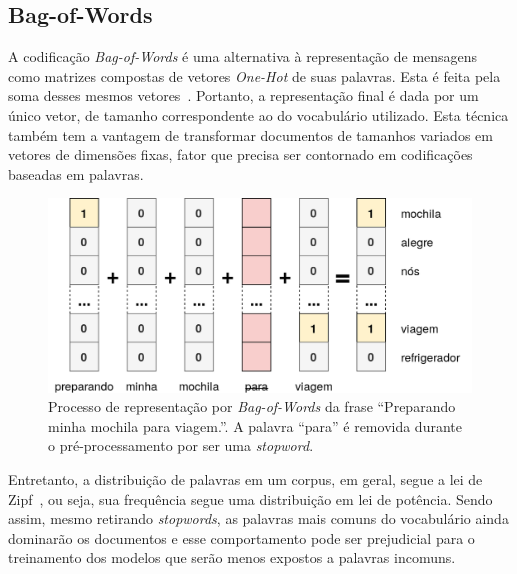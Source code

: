 \subsection{Bag-of-Words}

A codificação \textit{Bag-of-Words} é uma alternativa à representação de
mensagens como matrizes compostas de vetores \textit{One-Hot} de suas palavras.
Esta é feita pela soma desses mesmos vetores~\cite{manning10}.
Portanto, a representação final é dada por um único vetor, de tamanho
correspondente ao do vocabulário utilizado.
Esta técnica também tem a vantagem de transformar documentos de tamanhos variados
em vetores de dimensões fixas, fator que precisa ser contornado em codificações
baseadas em palavras.

\begin{figure}[h]
\begin{center} {
    \begin{center}
    \includegraphics[scale=0.30]{images/bag_of_words.png}
    \caption{Processo de representação por \textit{Bag-of-Words} da frase
             ``Preparando minha mochila para viagem.''.
             A palavra ``para'' é removida durante o pré-processamento por
             ser uma \textit{stopword}.}
    \label{fig:bag_of_words}
    \end{center}
}
\end{center}
\end{figure}

Entretanto, a distribuição de palavras em um corpus, em geral, segue a lei de
Zipf~\cite{powers98}, ou seja, sua frequência segue uma distribuição em lei de
potência.
Sendo assim, mesmo retirando \textit{stopwords}, as palavras mais comuns do
vocabulário ainda dominarão os documentos e esse comportamento pode ser
prejudicial para o treinamento dos modelos que serão menos expostos a palavras
incomuns.


